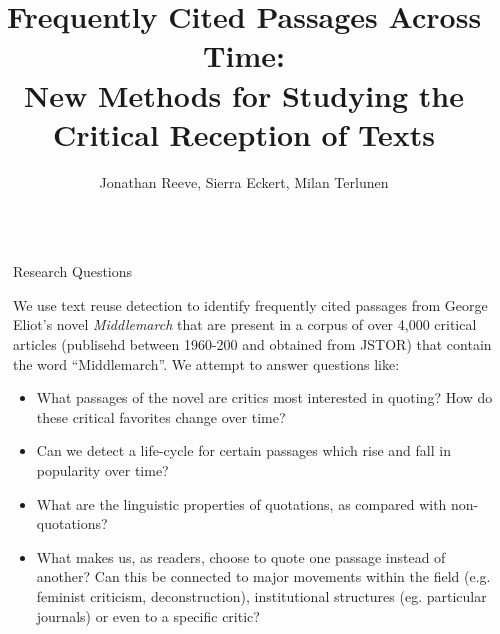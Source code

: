 \documentclass[final]{beamer}
\title{Frequently Cited Passages Across Time: \\ New
Methods for Studying the Critical Reception of
Texts} %
\author{Jonathan Reeve, Sierra Eckert, Milan Terlunen} %
\institute{Department of English and Comparative Literature, Columbia University} %
\newlength{\sepwid}
\newlength{\onecolwid}
\begin{document}

\setlength{\belowcaptionskip}{2ex} %
\setlength\belowdisplayshortskip{2ex} %

\begin{frame}[t] %

\begin{columns}[t] %

\begin{column}{\sepwid}\end{column} %

\begin{column}{\onecolwid} %


\begin{alertblock}{Research Questions}

We use text reuse detection to identify frequently cited passages from George Eliot's novel \emph{Middlemarch} that are present in a corpus of over 4,000 critical articles (publisehd between 1960-200 and obtained from JSTOR) that contain the word ``Middlemarch''. We attempt to answer questions like: 

\begin{itemize}
\item What passages of the novel are critics most interested in quoting? How do these critical favorites change over time?  
\item Can we detect a life-cycle for certain passages which rise and fall in popularity over time?
\item What are the linguistic properties of quotations, as compared with non-quotations?
\item What makes us, as readers, choose to quote one passage instead of another? Can this be connected to major movements within the field (e.g. feminist criticism, deconstruction), institutional structures (eg. particular journals) or even to a specific critic?
\end{itemize}


\end{alertblock}
\end{column}
\end{columns}
\end{frame}
\end{document}
